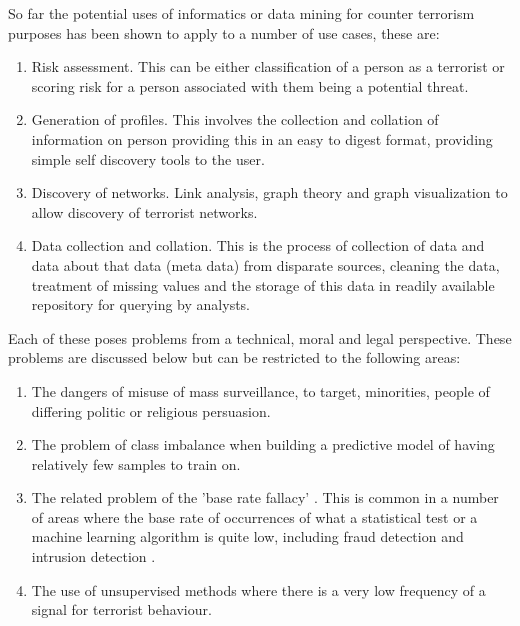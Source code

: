 So far the potential uses of informatics or data mining for counter terrorism purposes has been shown to apply to a number of use cases, these are:
\begin{enumerate}
\item Risk assessment. This can be either classification of a person as a terrorist or scoring risk for a person associated with them being a potential threat.
\item Generation of profiles. This involves the collection and collation of information on person providing this in an easy to digest format, providing simple self discovery tools to the user.
\item Discovery of networks. Link analysis, graph theory and graph visualization to allow discovery of terrorist networks.
\item Data collection and collation. This is the process of collection of data and data about that data (meta data) from disparate sources, cleaning the data, treatment of missing values and the storage of this data in readily available repository for querying by analysts.
\end{enumerate}

Each of these poses problems from a technical, moral and legal perspective. These problems are discussed below but can be restricted to the following areas:
\begin{enumerate}
\item The dangers of misuse of mass surveillance, to target, minorities, people of differing politic or religious persuasion.
\item The problem of class imbalance when building a predictive model of having relatively few samples to train on.
\item The related problem of the 'base rate fallacy' \citep{bar1980base}. This is common in a number of areas where the base rate of occurrences of what a statistical test or a machine learning algorithm is quite low, including fraud detection and intrusion detection \citep{axelsson2000base}.
\item The use of unsupervised methods where there is a very low frequency of a signal for terrorist behaviour.
\end{enumerate}

